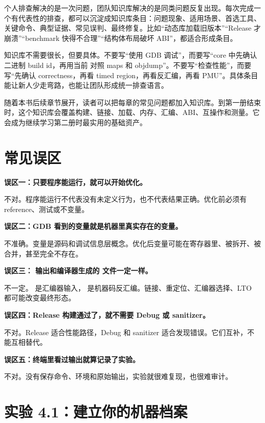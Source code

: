 个人排查解决的是一次问题，团队知识库解决的是同类问题反复出现。每次完成一个有代表性的排查，都可以沉淀成知识库条目：问题现象、适用场景、首选工具、关键命令、典型证据、常见误判、最终修复。比如“动态库加载旧版本”“Release 才崩溃”“benchmark 快得不合理”“结构体布局破坏 ABI”，都适合形成条目。

知识库不需要很长，但要具体。不要写“使用 GDB 调试”，而要写“core 中先确认二进制 build id，再用当前  对照 maps 和 objdump”。不要写“检查性能”，而要写“先确认 correctness，再看 timed region，再看反汇编，再看 PMU”。具体条目能让新人少走弯路，也能让团队形成统一排查语言。

随着本书后续章节展开，读者可以把每章的常见问题都加入知识库。到第一册结束时，这个知识库会覆盖构建、链接、加载、内存、汇编、ABI、互操作和测量。它会成为继续学习第二册时最实用的基础资产。

\section{常见误区}

\begin{warningbox}
\textbf{误区一：只要程序能运行，就可以开始优化。}

不对。程序能运行不代表没有未定义行为，也不代表结果正确。优化前必须有 reference、测试或不变量。

\textbf{误区二：GDB 看到的变量就是机器里真实存在的变量。}

不准确。变量是源码和调试信息层概念。优化后变量可能在寄存器里、被拆开、被合并，甚至完全不存在。

\textbf{误区三： 输出和编译器生成的  文件一定一样。}

不一定。 是汇编器输入， 是机器码反汇编。链接、重定位、汇编器选择、LTO 都可能改变最终形态。

\textbf{误区四：Release 构建通过了，就不需要 Debug 或 sanitizer。}

不对。Release 适合性能路径，Debug 和 sanitizer 适合发现错误。它们互补，不能互相替代。

\textbf{误区五：终端里看过输出就算记录了实验。}

不对。没有保存命令、环境和原始输出，实验就很难复现，也很难审计。
\end{warningbox}

\section{实验 4.1：建立你的机器档案}

